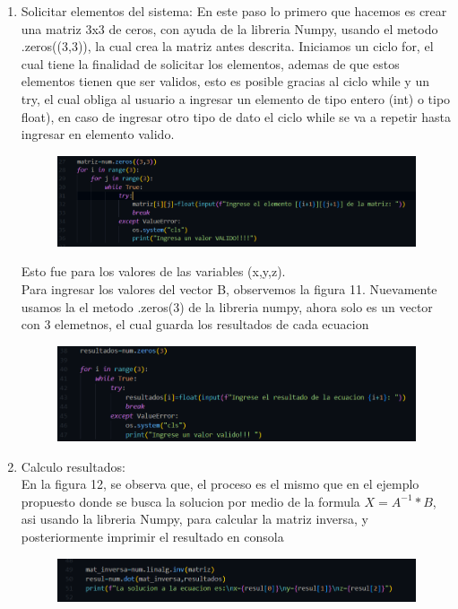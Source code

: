 \documentclass[12pt]{article}
\begin{document}
\begin{itemize}
\begin{enumerate}
	\item Solicitar elementos del sistema: En este paso lo primero que hacemos es crear una matriz 3x3 de ceros, con ayuda de la libreria Numpy, usando el metodo .zeros((3,3)), la cual crea la matriz antes descrita. Iniciamos un ciclo for, el cual tiene la finalidad de solicitar los elementos, ademas de que estos elementos tienen que ser validos, esto es posible gracias al ciclo while y un try, el cual obliga al usuario a ingresar un elemento de tipo entero (int) o tipo float), en caso de ingresar otro tipo de dato el ciclo while se va a repetir hasta ingresar en elemento valido. 
	\begin{figure}[H]
		\begin{center}
 			\includegraphics[width = .8\textwidth]{datos_mat.png}
		\end{center} 
	\end{figure}
	Esto fue para los valores de las variables (x,y,z).\\
	Para ingresar los valores del vector B, observemos la figura 11. Nuevamente usamos la el metodo .zeros(3) de la libreria numpy, ahora solo es un vector con 3 elemetnos, el cual guarda los resultados de cada ecuacion
	\begin{figure}[H]
		\begin{center}
 			\includegraphics[width = .8\textwidth]{vec_b.png}
		\end{center} 
	\end{figure}
	\item Calculo resultados: \\
	En la figura 12, se observa que, el proceso es el mismo que en el ejemplo propuesto donde se busca la solucion por medio de la formula $ X=A^{-1}*B$, asi usando la libreria Numpy, para calcular la matriz inversa, y posteriormente imprimir el resultado en consola
	\begin{figure}[H]
		\begin{center}
 			\includegraphics[width = .8\textwidth]{sol_mat.png}
		\end{center} 
	\end{figure}
	

\end{enumerate}
\end{itemize}
\end{document}
